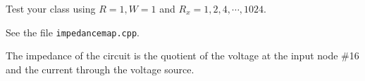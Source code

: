 \begin{problem}
\begin{subproblem}[3]
Test your class using $R = 1, W = 1$ and $R_x=1,2,4,\cdots,1024$.
\begin{hint}
 See the file \texttt{impedancemap.cpp}.
\end{hint}

\begin{hint}
  The impedance of the circuit is the quotient of the voltage at the
  input node \#16 and the current through the voltage source.
\end{hint}


\end{subproblem}


\end{problem}
